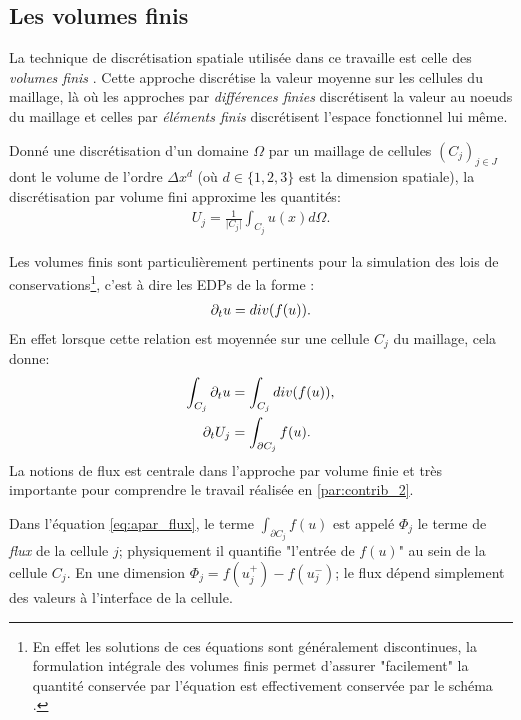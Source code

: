\subsection{Les volumes finis}
    La technique de discrétisation spatiale utilisée dans ce travaille est celle des \textit{volumes finis} \cite{LeVeque1990}.
    Cette approche discrétise la valeur moyenne sur les cellules du maillage, là où les approches par \textit{différences finies} \cite{LeVeque2007} discrétisent la valeur au noeuds du maillage et 
    celles par \textit{éléments finis} \cite{Ciarlet1982} discrétisent l'espace fonctionnel lui même.
    \begin{definition}
        Donné une discrétisation d'un domaine $\Omega$ par un maillage de cellules $(C_j)_{j\in J}$ dont le volume de l'ordre $\Delta x^d$ (où $d \in \{1,2,3\}$ est la dimension spatiale), 
        la discrétisation par volume fini approxime les quantités:
        \begin{align}
            U_j = \frac{1}{\vert C_j \vert} \int_{C_j} u(x) d\Omega.
        \end{align}
    \end{definition}
    Les volumes finis sont particulièrement pertinents pour la simulation des lois de conservations\footnote{
        En effet les solutions de ces équations sont généralement discontinues, la formulation intégrale des volumes finis permet
        d'assurer "facilement" la quantité conservée par l'équation est effectivement conservée par le schéma \cite{LeVeque1990}.
    }, c'est à dire les EDPs de la forme :
    \begin{align}
        \partial_t u = div(f(u)).
    \end{align}
    En effet lorsque cette relation est moyennée sur une cellule $C_j$ du maillage, cela donne: 
    \begin{align}
        \int_{C_j} \partial_t u&= \int_{C_j}  div(f(u)),\\
        \partial_t U_j &= \int_{\partial C_j} f(u).\label{eq:apar_flux}
    \end{align}
    La notions de flux est centrale dans l'approche par volume finie et très importante pour comprendre le travail réalisée en \ref{par:contrib_2}.
    \begin{definition}
        Dans l'équation \ref{eq:apar_flux}, le terme $\int_{\partial C_j} f(u)$ est appelé $\Phi_j$ le terme de \textit{flux} de la cellule $j$;
        physiquement il quantifie "l'entrée de $f(u)$" au sein de la cellule $C_j$. En une dimension $\Phi_j = f(u^+_j) - f(u^-_j)$;
        le flux dépend simplement des valeurs à l'interface de la cellule.
    \end{definition}
